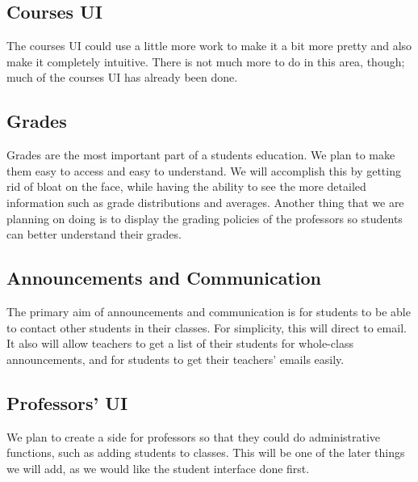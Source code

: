 \documentclass{article}
\begin{document}
\subsection{Courses UI}

The courses UI could use a little more work to make it a bit more pretty and also make it
completely intuitive. There is not much more to do in this area, though; much
of the courses UI has already been done.

\subsection{Grades}

Grades are the most important part of a students education. We plan to make them easy
to access and easy to understand. We will accomplish this by getting rid of bloat
on the face, while having the ability to see the more detailed information such as
grade distributions and averages. Another thing that we are planning on doing is 
to display the grading policies of the professors so students can better understand
their grades.

\subsection{Announcements and Communication}

The primary aim of announcements and communication is for students to be able
to contact other students in their classes. For simplicity, this will direct to
email. It also will allow teachers to get a list of their students for whole-class
announcements, and for students to get their teachers' emails easily.

\subsection{Professors' UI}

We plan to create a side for professors so that they could do administrative
functions, such as adding students to classes. This will be one of the later
things we will add, as we would like the student interface done first. 

{} 
\end{document}
